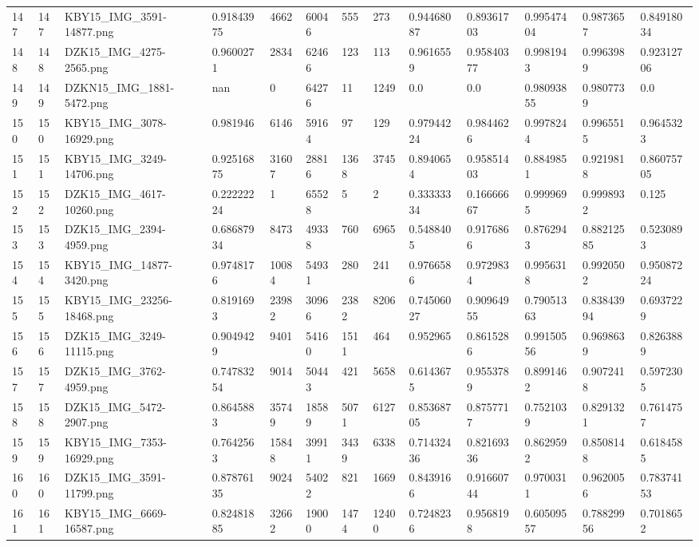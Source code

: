 \documentclass[11pt, a4paper, twoside]{report}
\begin{document}
\begin{longtable}[c]{@{}lllllllllllll@{}}
147 & 147 & KBY15\_IMG\_3591-14877.png & 0.91843975 & 4662 & 60046 & 555 & 273 & 0.94468087 & 0.89361703 & 0.99547404 & 0.9873657 & 0.84918034 \\
148 & 148 & DZK15\_IMG\_4275-2565.png & 0.9600271 & 2834 & 62466 & 123 & 113 & 0.9616559 & 0.95840377 & 0.9981943 & 0.9963989 & 0.92312706 \\
149 & 149 & DZKN15\_IMG\_1881-5472.png & nan & 0 & 64276 & 11 & 1249 & 0.0 & 0.0 & 0.98093855 & 0.9807739 & 0.0 \\
150 & 150 & KBY15\_IMG\_3078-16929.png & 0.981946 & 6146 & 59164 & 97 & 129 & 0.97944224 & 0.9844626 & 0.9978244 & 0.9965515 & 0.9645323 \\
151 & 151 & KBY15\_IMG\_3249-14706.png & 0.92516875 & 31607 & 28816 & 1368 & 3745 & 0.8940654 & 0.95851403 & 0.8849851 & 0.9219818 & 0.86075705 \\
152 & 152 & DZK15\_IMG\_4617-10260.png & 0.22222224 & 1 & 65528 & 5 & 2 & 0.33333334 & 0.16666667 & 0.9999695 & 0.9998932 & 0.125 \\
153 & 153 & DZK15\_IMG\_2394-4959.png & 0.68687934 & 8473 & 49338 & 760 & 6965 & 0.5488405 & 0.9176866 & 0.8762943 & 0.88212585 & 0.5230893 \\
154 & 154 & KBY15\_IMG\_14877-3420.png & 0.9748176 & 10084 & 54931 & 280 & 241 & 0.9766586 & 0.9729834 & 0.9956318 & 0.9920502 & 0.95087224 \\
155 & 155 & KBY15\_IMG\_23256-18468.png & 0.8191693 & 23982 & 30966 & 2382 & 8206 & 0.74506027 & 0.90964955 & 0.79051363 & 0.83843994 & 0.6937229 \\
156 & 156 & DZK15\_IMG\_3249-11115.png & 0.9049429 & 9401 & 54160 & 1511 & 464 & 0.952965 & 0.8615286 & 0.99150556 & 0.9698639 & 0.8263889 \\
157 & 157 & DZK15\_IMG\_3762-4959.png & 0.74783254 & 9014 & 50443 & 421 & 5658 & 0.6143675 & 0.9553789 & 0.8991462 & 0.9072418 & 0.5972305 \\
158 & 158 & DZK15\_IMG\_5472-2907.png & 0.8645883 & 35749 & 18589 & 5071 & 6127 & 0.85368705 & 0.8757717 & 0.7521039 & 0.8291321 & 0.7614757 \\
159 & 159 & KBY15\_IMG\_7353-16929.png & 0.7642563 & 15848 & 39911 & 3439 & 6338 & 0.71432436 & 0.82169336 & 0.8629592 & 0.8508148 & 0.6184585 \\
160 & 160 & DZK15\_IMG\_3591-11799.png & 0.87876135 & 9024 & 54022 & 821 & 1669 & 0.8439166 & 0.91660744 & 0.9700311 & 0.9620056 & 0.78374153 \\
161 & 161 & KBY15\_IMG\_6669-16587.png & 0.82481885 & 32662 & 19000 & 1474 & 12400 & 0.7248236 & 0.9568198 & 0.60509557 & 0.78829956 & 0.7018652 \\

\end{longtable}
\end{document}
